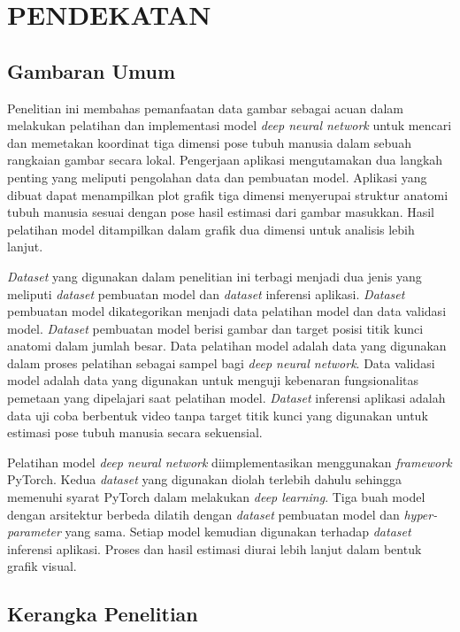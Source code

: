 
\chapter{PENDEKATAN}
\label{cha:3-Pendekatan}

\section{Gambaran Umum} \label{sec:3-GambaranUmum}

Penelitian ini membahas pemanfaatan data gambar sebagai acuan dalam melakukan pelatihan dan
implementasi model \textit{deep neural network} untuk mencari dan memetakan koordinat tiga dimensi
pose tubuh manusia dalam sebuah rangkaian gambar secara lokal. Pengerjaan aplikasi mengutamakan dua
langkah penting yang meliputi pengolahan data dan pembuatan model. Aplikasi yang dibuat dapat menampilkan
plot grafik tiga dimensi menyerupai struktur anatomi tubuh manusia sesuai dengan pose hasil
estimasi dari gambar masukkan. Hasil pelatihan model ditampilkan dalam grafik dua dimensi untuk
analisis lebih lanjut.

\textit{Dataset} yang digunakan dalam penelitian ini terbagi menjadi dua jenis yang meliputi
\textit{dataset} pembuatan model dan \textit{dataset} inferensi aplikasi.
\textit{Dataset} pembuatan model dikategorikan menjadi data pelatihan model dan data validasi model.
\textit{Dataset} pembuatan model berisi gambar dan target posisi titik kunci anatomi dalam jumlah besar.
Data pelatihan model adalah data yang digunakan dalam proses pelatihan sebagai sampel bagi \textit{deep neural network}.
Data validasi model adalah data yang digunakan untuk menguji kebenaran fungsionalitas pemetaan yang
dipelajari saat pelatihan model. \textit{Dataset} inferensi aplikasi adalah data uji coba berbentuk
video tanpa target titik kunci yang digunakan untuk estimasi pose tubuh manusia secara sekuensial.

Pelatihan model \textit{deep neural network} diimplementasikan menggunakan \textit{framework} PyTorch.
Kedua \textit{dataset} yang digunakan diolah terlebih dahulu sehingga memenuhi syarat PyTorch dalam melakukan
\textit{deep learning}.
Tiga buah model dengan arsitektur berbeda dilatih dengan \textit{dataset} pembuatan model dan
\textit{hyper-parameter} yang sama. Setiap model kemudian digunakan terhadap \textit{dataset} inferensi
aplikasi. Proses dan hasil estimasi diurai lebih lanjut dalam bentuk grafik visual.

\section{Kerangka Penelitian} \label{sec:3-KerangkaPenelitian}

